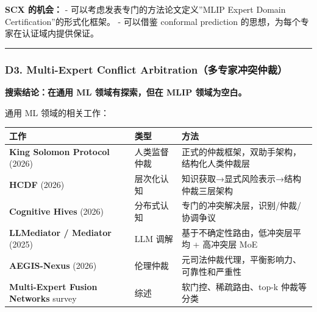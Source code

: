 \documentclass[
  12pt,
]{ctexart}
\begin{document}
\textbf{SCX 的机会：} - 可以考虑发表专门的方法论文定义''MLIP Expert
Domain Certification''的形式化框架。 - 可以借鉴 conformal prediction
的思想，为每个专家在认证域内提供保证。

\begin{center}\rule{0.5\linewidth}{0.5pt}\end{center}

\subsubsection{D3. Multi-Expert Conflict
Arbitration（多专家冲突仲裁）}\label{d3.-multi-expert-conflict-arbitrationux591aux4e13ux5bb6ux51b2ux7a81ux4ef2ux88c1}

\textbf{搜索结论：在通用 ML 领域有探索，但在 MLIP 领域为空白。}

通用 ML 领域的相关工作：

\begin{longtable}[]{@{}
  >{\raggedright\arraybackslash}p{}
  >{\raggedright\arraybackslash}p{}
  >{\raggedright\arraybackslash}p{}@{}}
\toprule\noalign{}
\begin{minipage}[b]{\linewidth}\raggedright
工作
\end{minipage} & \begin{minipage}[b]{\linewidth}\raggedright
类型
\end{minipage} & \begin{minipage}[b]{\linewidth}\raggedright
方法
\end{minipage} \\
\midrule\noalign{}
\endhead
\bottomrule\noalign{}
\endlastfoot
\textbf{King Solomon Protocol} (2026) & 人类监督仲裁 &
正式的仲裁框架，双助手架构，结构化人类仲裁层 \\
\textbf{HCDF} (2026) & 层次化认知 &
知识获取→显式风险表示→结构仲裁三层架构 \\
\textbf{Cognitive Hives} (2026) & 分布式认知 &
专门的冲突解决层，识别/仲裁/协调争议 \\
\textbf{LLMediator / Mediator} (2025) & LLM 调解 &
基于不确定性路由，低冲突层平均 + 高冲突层 MoE \\
\textbf{AEGIS-Nexus} (2026) & 伦理仲裁 &
元司法仲裁代理，平衡影响力、可靠性和严重性 \\
\textbf{Multi-Expert Fusion Networks} survey & 综述 &
软门控、稀疏路由、top-k 仲裁等分类 \\
\end{longtable}
\end{document}
